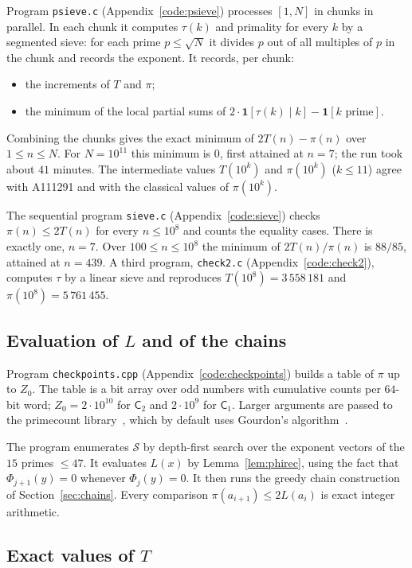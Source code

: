 \documentclass[11pt,a4paper]{article}
\theoremstyle{definition}
\newcommand{\cS}{\mathcal S}
\begin{document}
Program \texttt{psieve.c} (Appendix~\ref{code:psieve}) processes $[1,N]$ in chunks in parallel. In each chunk it computes $\tau(k)$ and primality for every $k$ by a segmented sieve: for each prime $p\le\sqrt N$ it divides $p$ out of all multiples of $p$ in the chunk and records the exponent. It records, per chunk:
\begin{itemize}
\item the increments of $T$ and $\pi$;
\item the minimum of the local partial sums of $2\cdot\mathbf 1[\tau(k)\mid k]-\mathbf 1[k \text{ prime}]$.
\end{itemize}
Combining the chunks gives the exact minimum of $2T(n)-\pi(n)$ over $1\le n\le N$. For $N=10^{11}$ this minimum is $0$, first attained at $n=7$; the run took about $41$ minutes. The intermediate values $T(10^{k})$ and $\pi(10^{k})$ ($k\le11$) agree with A111291 and with the classical values of $\pi(10^k)$.

The sequential program \texttt{sieve.c} (Appendix~\ref{code:sieve}) checks $\pi(n)\le2T(n)$ for every $n\le10^{8}$ and counts the equality cases. There is exactly one, $n=7$. Over $100\le n\le10^{8}$ the minimum of $2T(n)/\pi(n)$ is $88/85$, attained at $n=439$. A third program, \texttt{check2.c} (Appendix~\ref{code:check2}), computes $\tau$ by a linear sieve and reproduces $T(10^{8})=3\,558\,181$ and $\pi(10^8)=5\,761\,455$.

\subsection{Evaluation of \texorpdfstring{$L$}{L} and of the chains}

Program \texttt{checkpoints.cpp} (Appendix~\ref{code:checkpoints}) builds a table of $\pi$ up to $Z_0$. The table is a bit array over odd numbers with cumulative counts per $64$-bit word; $Z_0=2\cdot10^{10}$ for $\mathsf C_2$ and $2\cdot10^{9}$ for $\mathsf C_1$. Larger arguments are passed to the primecount library~\cite{primecount}, which by default uses Gourdon's algorithm~\cite{Go01}.

The program enumerates $\cS$ by depth-first search over the exponent vectors of the $15$ primes $\le47$. It evaluates $L(x)$ by Lemma~\ref{lem:phirec}, using the fact that $\Phi_{j+1}(y)=0$ whenever $\Phi_j(y)=0$. It then runs the greedy chain construction of Section~\ref{sec:chains}. Every comparison $\pi(a_{i+1})\le2L(a_i)$ is exact integer arithmetic.

\subsection{Exact values of \texorpdfstring{$T$}{T}}\label{sec:exactdata}
\end{document}
